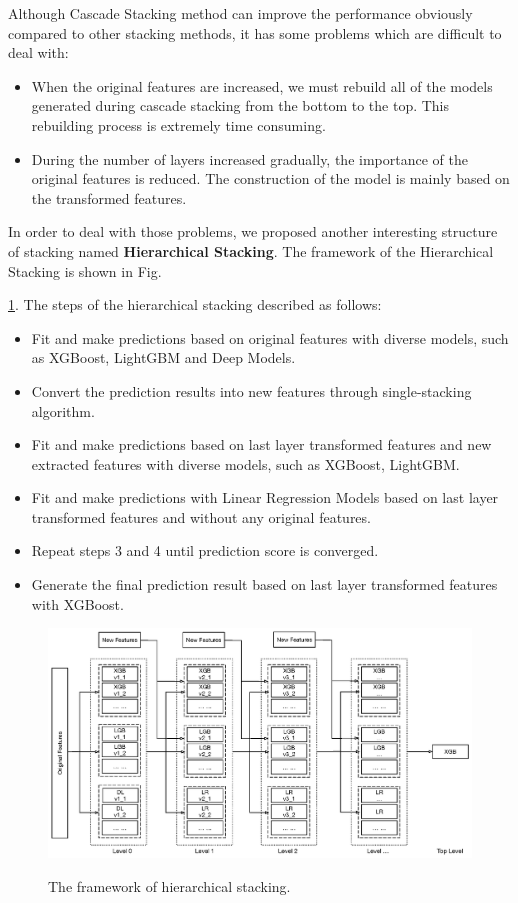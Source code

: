 \documentclass[12pt]{article}
\begin{document}
Although Cascade Stacking method can improve the performance obviously compared to other stacking methods, it has some problems which are difficult to deal with:

\begin{itemize}
\item[1.] When the original features are increased, we must rebuild all of the models generated during cascade stacking from the bottom to the top. This rebuilding process is extremely time consuming.
\item[2.] During the number of layers increased gradually, the importance of the original features is reduced. The construction of the model is mainly based on the transformed features. 
\end{itemize}

In order to deal with those problems, we proposed another interesting structure of stacking named \textbf{Hierarchical Stacking}. The framework of the Hierarchical Stacking  is shown in Fig.~{\ref{fig:hierarchical-stacking}. The steps of the hierarchical stacking described as follows:

\begin{itemize}
\label{alg:cascade-stacking}
\item[1.] Fit and make predictions based on original features with diverse models, such as XGBoost, LightGBM and Deep Models.
\item[2.] Convert the prediction results into new features through single-stacking algorithm.
\item[3.] Fit and make predictions based on last layer transformed features and new extracted features with diverse models, such as XGBoost, LightGBM.
\item[4.] Fit and make predictions with Linear Regression Models based on last layer transformed features and without any original features.
\item[5.] Repeat steps 3 and 4 until prediction score is converged.
\item[6.] Generate the final prediction result based on last layer transformed features with XGBoost.
\end{itemize}


\begin{figure}[ht]
  \centering
  \includegraphics[width=1.0\textwidth]{../img/hierarchical-stacking}\\
  \caption{The framework of hierarchical stacking.}
  \label{fig:hierarchical-stacking}
\end{figure}

}
\end{document}
